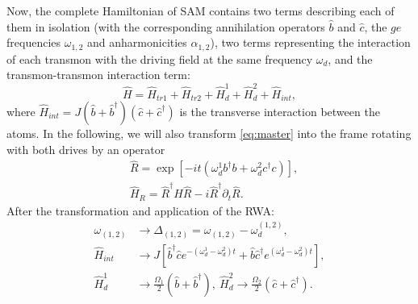 \documentclass[%
 aip,
 amsmath,amssymb,
 reprint,%
]{revtex4-1}
\begin{document}
Now, the complete Hamiltonian of SAM contains two terms describing each of them in isolation (with the corresponding annihilation operators $\hat b$ and $\hat c$, the $ge$ frequencies $\omega_{1,2}$ and anharmonicities $\alpha_{1,2}$), two terms representing the interaction of each transmon with the driving field at the same frequency $\omega_d$, and the transmon-transmon interaction term:
\begin{equation}\label{Hsystem}
\hat H = \hat H_{tr1}+\hat H_{tr2}+\hat H_{d}^1+\hat H_{d}^2+\hat H_{int},
\end{equation}
where $\hat H_{int} = J (\hat b +\hat b^\dag)(\hat c+\hat c^{\dagger})$ is the transverse interaction between the atoms. In the following, we will also transform \eqref{eq:master} into the frame rotating with both drives by an operator
\begin{align}
&\hat R = \exp[-i t (\omega_d^1 b^{\dagger}b+\omega_d^2 c^{\dagger}c)],\label{eq:R}\\
&\hat H_R = \hat R^{\dagger}\hat H \hat R - i\hat R^{\dagger}\partial_t \hat R.\label{eq:rotation}
\end{align}
After the transformation and application of the RWA:
\begin{equation}
\begin{aligned}
	\omega_{(1,2)} &\rightarrow \Delta_{(1,2)} = \omega_{(1,2)} - \omega_d^{(1,2)},\\
	\hat H_{int} &\rightarrow J \left[\hat b^\dag \hat c e^{-(\omega_d^1 - \omega_d^2)t} + \hat b \hat c^\dag e^{(\omega_d^1 - \omega_d^2)t}\right],\\
	\hat H_{d}^1 &\rightarrow \frac{\Omega_1}{2}(\hat b  + \hat b^\dag),\ 	\hat H_{d}^2 \rightarrow \frac{\Omega_2}{2}(\hat c  + \hat c^\dag).
\end{aligned}
\label{eq:RWA}
\end{equation}
\end{document}
